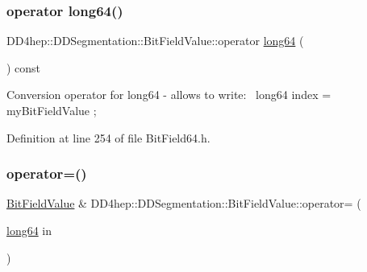 \hypertarget{class_d_d4hep_1_1_d_d_segmentation_1_1_bit_field_value_a12c287efc1ff28225a05df20dafa47a3}{}\label{class_d_d4hep_1_1_d_d_segmentation_1_1_bit_field_value_a12c287efc1ff28225a05df20dafa47a3} 
\subsubsection{\texorpdfstring{operator long64()}{operator long64()}}
{\footnotesize\ttfamily D\+D4hep\+::\+D\+D\+Segmentation\+::\+Bit\+Field\+Value\+::operator \hyperlink{namespace_d_d4hep_ac2a70e722b33dc7ddaa20db8954ac836}{long64} (\begin{DoxyParamCaption}{ }\end{DoxyParamCaption}) const\hspace{0.3cm}{\ttfamily [inline]}}

Conversion operator for long64 -\/ allows to write\+:~\newline
 long64 index = my\+Bit\+Field\+Value ; 

Definition at line 254 of file Bit\+Field64.\+h.

\hypertarget{class_d_d4hep_1_1_d_d_segmentation_1_1_bit_field_value_a0d388c5d7d243d80da663a23b420cfde}{}\label{class_d_d4hep_1_1_d_d_segmentation_1_1_bit_field_value_a0d388c5d7d243d80da663a23b420cfde} 
\subsubsection{\texorpdfstring{operator=()}{operator=()}}
{\footnotesize\ttfamily \hyperlink{class_d_d4hep_1_1_d_d_segmentation_1_1_bit_field_value}{Bit\+Field\+Value} \& D\+D4hep\+::\+D\+D\+Segmentation\+::\+Bit\+Field\+Value\+::operator= (\begin{DoxyParamCaption}\item[{\hyperlink{namespace_d_d4hep_ac2a70e722b33dc7ddaa20db8954ac836}{long64}}]{in }\end{DoxyParamCaption})}

